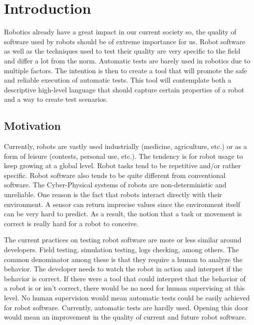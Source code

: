 \chapter{Introduction}
\label{chap:introduction}

Robotics already have a great impact in our current society so, 
the quality of software used by robots should be of extreme importance for us.
Robot software as well as the techniques used to test their quality are 
very specific to the field and differ a lot from the norm.
Automatic tests are barely used in robotics due to multiple factors.
The intention is then to create a tool that will promote the safe 
and reliable execution of automatic tests.
This tool will contemplate both a descriptive high-level language 
that should capture certain properties of a robot and a way to create test scenarios.

\section{Motivation}
\label{sec:motivation}

Currently, robots are vastly used industrially (medicine, agriculture, etc.) 
or as a form of leisure (contests, personal use, etc.).
The tendency is for robot usage to keep growing at a global level.
Robot tasks tend to be repetitive and/or rather specific.
Robot software also tends to be quite different from conventional software.
The Cyber-Physical systems of robots are non-deterministic and unreliable.
One reason is the fact that robots interact directly with their environment.
A sensor can return imprecise values since the environment itself can be very hard to predict.
As a result, the notion that a task or movement is correct is really hard for a robot to conceive.

\par

The current practices on testing robot software are more or less similar around developers.
Field testing, simulation testing, logs checking, among others.
The common denominator among these is that they require a human to analyze the behavior.
The developer needs to watch the robot in action and interpret if the behavior is correct.
If there were a tool that could interpret that the behavior of a robot is or isn't correct, 
there would be no need for human supervising at this level.
No human supervision would mean automatic tests could be easily achieved for robot software.
Currently, automatic tests are hardly used. Opening this door would mean an improvement 
in the quality of current and future robot software.


